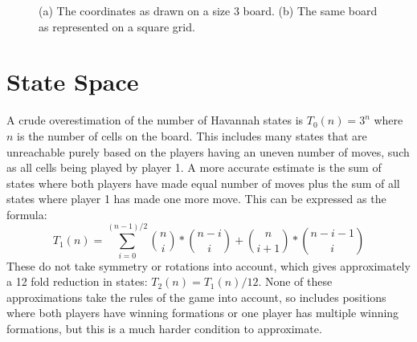 \begin{figure}
\centering
\caption{(a) The coordinates as drawn on a size 3 board. (b) The same board as represented on a square grid.}
\label{fig:coordinates}
\end{figure}


\section{State Space}

A crude overestimation of the number of Havannah states is $T_0(n) = 3^n$ where $n$ is the number of cells on the board. This includes many states that are unreachable purely based on the players having an uneven number of moves, such as all cells being played by player 1. A more accurate estimate is the sum of states where both players have made equal number of moves plus the sum of all states where player 1 has made one more move. This can be expressed as the formula:
$$T_1(n) = \sum_{i = 0}^{(n-1)/2} {n \choose i}*{n-i \choose i} + {n \choose i + 1}*{n - i - 1 \choose i}$$
These do not take symmetry or rotations into account, which gives approximately a 12 fold reduction in states: $T_2(n) = T_1(n)/12$. None of these approximations take the rules of the game into account, so includes positions where both players have winning formations or one player has multiple winning formations, but this is a much harder condition to approximate.

